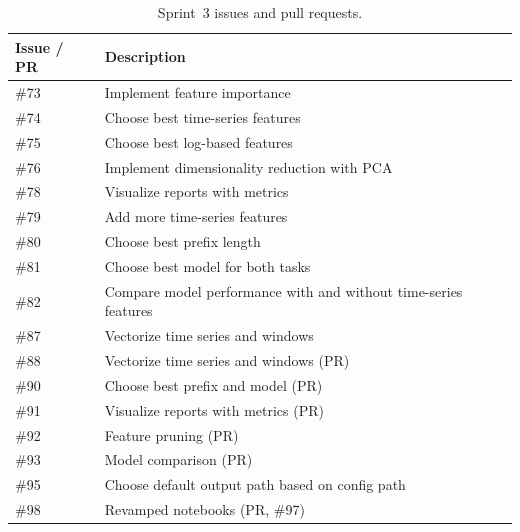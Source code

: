 \documentclass[runningheads]{llncs}
\begin{document}
\begin{table}[H]
    \centering
    \caption{Sprint~3 issues and pull requests.}
    \label{tab:sprint3_issues}
    \begin{tabularx}{0.85\textwidth}{lX}
        \toprule
        \textbf{Issue / PR} & \textbf{Description}                                            \\
        \midrule
        \#73                & Implement feature importance                                    \\
        \#74                & Choose best time-series features                                \\
        \#75                & Choose best log-based features                                  \\
        \#76                & Implement dimensionality reduction with PCA                     \\
        \#78                & Visualize reports with metrics                                  \\
        \#79                & Add more time-series features                                   \\
        \#80                & Choose best prefix length                                       \\
        \#81                & Choose best model for both tasks                                \\
        \#82                & Compare model performance with and without time-series features \\
        \#87                & Vectorize time series and windows                               \\
        \#88                & Vectorize time series and windows (PR)                          \\
        \#90                & Choose best prefix and model (PR)                               \\
        \#91                & Visualize reports with metrics (PR)                             \\
        \#92                & Feature pruning (PR)                                            \\
        \#93                & Model comparison (PR)                                           \\
        \#95                & Choose default output path based on config path                 \\
        \#98                & Revamped notebooks (PR, \#97)                                   \\
        \bottomrule
    \end{tabularx}
\end{table}
\end{document}
